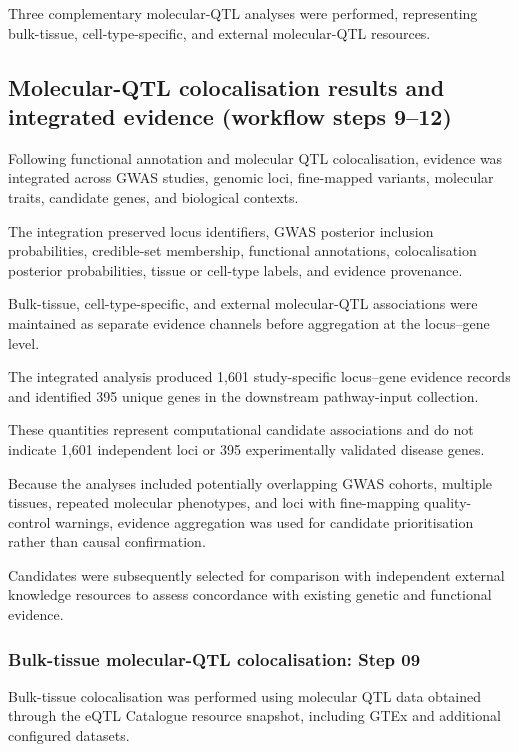 \documentclass[11pt,a4paper]{article}
\begin{document}
Three complementary molecular-QTL analyses were
performed, representing bulk-tissue, cell-type-specific,
and external molecular-QTL resources.


\subsection{Molecular-QTL colocalisation results and integrated evidence (workflow steps 9--12)}
\label{sec:evidence_integration}

Following functional annotation and molecular QTL
colocalisation, evidence was integrated across
GWAS studies, genomic loci, fine-mapped variants,
molecular traits, candidate genes, and biological
contexts.

The integration preserved locus identifiers,
GWAS posterior inclusion probabilities,
credible-set membership, functional annotations,
colocalisation posterior probabilities, tissue
or cell-type labels, and evidence provenance.

Bulk-tissue, cell-type-specific, and external
molecular-QTL associations were maintained as
separate evidence channels before aggregation
at the locus--gene level.

The integrated analysis produced 1,601
study-specific locus--gene evidence records
and identified 395 unique genes in the
downstream pathway-input collection.

These quantities represent computational
candidate associations and do not indicate
1,601 independent loci or 395 experimentally
validated disease genes.

Because the analyses included potentially
overlapping GWAS cohorts, multiple tissues,
repeated molecular phenotypes, and loci with
fine-mapping quality-control warnings,
evidence aggregation was used for candidate
prioritisation rather than causal confirmation.

Candidates were subsequently selected for
comparison with independent external
knowledge resources to assess concordance
with existing genetic and functional
evidence.



\subsubsection{Bulk-tissue molecular-QTL colocalisation:
Step 09}

Bulk-tissue colocalisation was performed using molecular
QTL data obtained through the eQTL Catalogue resource
snapshot, including GTEx and additional configured
datasets.
\end{document}
